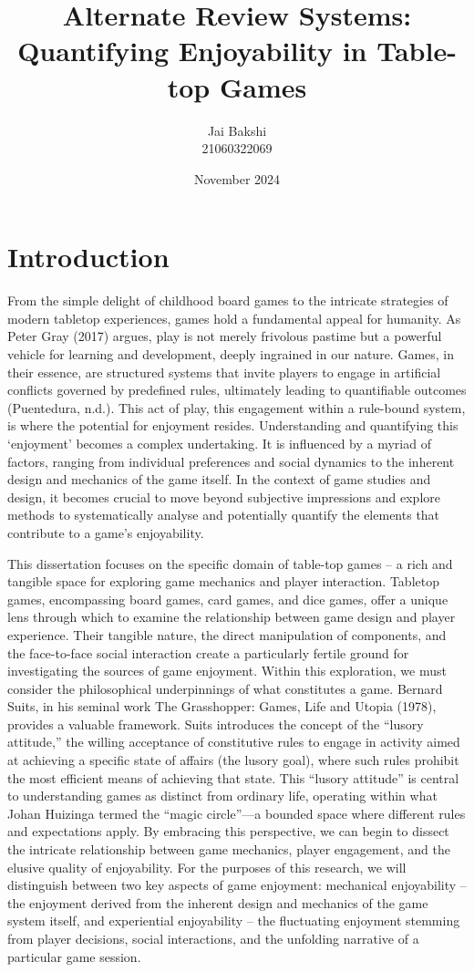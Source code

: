 \documentclass[12pt]{report}
\title{Alternate Review Systems:\\ Quantifying Enjoyability in Table-top Games}
\author{Jai Bakshi \\ 21060322069}
\date{November 2024}
\begin{document}
	\maketitle
	\setcounter{chapter}{-1}
	\chapter{Introduction}
	From the simple delight of childhood board games to the intricate strategies of modern tabletop experiences, games hold a fundamental appeal for humanity. As Peter Gray (2017)  argues, play is not merely frivolous pastime but a powerful vehicle for learning and development, deeply ingrained in our nature. Games, in their essence, are structured systems that invite players to engage in artificial conflicts governed by predefined rules, ultimately leading to quantifiable outcomes (Puentedura, n.d.). This act of play, this engagement within a rule-bound system, is where the potential for enjoyment resides. Understanding and quantifying this ‘enjoyment’ becomes a complex undertaking. It is influenced by a myriad of factors, ranging from individual preferences and social dynamics to the inherent design and mechanics of the game itself. In the context of game studies and design, it becomes crucial to move beyond subjective impressions and explore methods to systematically analyse and potentially quantify the elements that contribute to a game's enjoyability.
	
	This dissertation focuses on the specific domain of table-top games – a rich and tangible space for exploring game mechanics and player interaction. Tabletop games, encompassing board games, card games, and dice games, offer a unique lens through which to examine the relationship between game design and player experience. Their tangible nature, the direct manipulation of components, and the face-to-face social interaction create a particularly fertile ground for investigating the sources of game enjoyment. Within this exploration, we must consider the philosophical underpinnings of what constitutes a game. Bernard Suits, in his seminal work The Grasshopper: Games, Life and Utopia (1978), provides a valuable framework. Suits introduces the concept of the ``lusory attitude,'' the willing acceptance of constitutive rules to engage in activity aimed at achieving a specific state of affairs (the lusory goal), where such rules prohibit the most efficient means of achieving that state. This ``lusory attitude'' is central to understanding games as distinct from ordinary life, operating within what Johan Huizinga termed the ``magic circle''—a bounded space where different rules and expectations apply. By embracing this perspective, we can begin to dissect the intricate relationship between game mechanics, player engagement, and the elusive quality of enjoyability. For the purposes of this research, we will distinguish between two key aspects of game enjoyment: mechanical enjoyability – the enjoyment derived from the inherent design and mechanics of the game system itself, and experiential enjoyability – the fluctuating enjoyment stemming from player decisions, social interactions, and the unfolding narrative of a particular game session.
	
\end{document}

